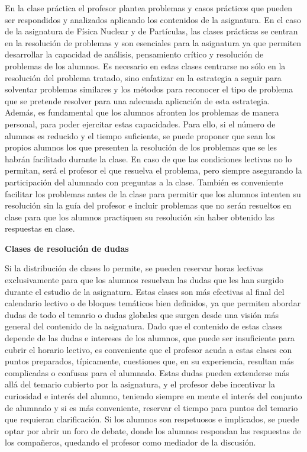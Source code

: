\documentclass[a4paper,12pt,twoside]{article}
\begin{document}
En la clase práctica el profesor plantea problemas y casos prácticos que pueden ser respondidos y analizados aplicando los contenidos de la asignatura. En el caso de la asignatura de Física Nuclear y de Partículas, las clases prácticas se centran en la resolución de problemas y son esenciales para la asignatura ya que permiten desarrollar la capacidad de análisis, pensamiento crítico y resolución de problemas de los alumnos. Es necesario en estas clases centrarse no sólo en la resolución del problema tratado, sino enfatizar en la estrategia a seguir para solventar problemas similares y los métodos para reconocer el tipo de problema que se pretende resolver para una adecuada aplicación de esta estrategia. Además, es fundamental que los alumnos afronten los problemas de manera personal, para poder ejercitar estas capacidades. Para ello, si el número de alumnos es reducido y el tiempo suficiente, se puede proponer que sean los propios alumnos los que presenten la resolución de los problemas que se les habrán facilitado durante la clase. En caso de que las condiciones lectivas no lo permitan, será el profesor el que resuelva el problema, pero siempre asegurando la participación del alumnado con preguntas a la clase. También es conveniente facilitar los problemas antes de la clase para permitir que los alumnos intenten su resolución sin la guía del profesor e incluir problemas que no serán resueltos en clase para que los alumnos practiquen su resolución sin haber obtenido las respuestas en clase. 

\textbf{Clases de resolución de dudas} 

Si la distribución de clases lo permite, se pueden reservar horas lectivas exclusivamente para que los alumnos resuelvan las dudas que les han surgido durante el estudio de la asignatura. Estas clases son más efectivas al final del calendario lectivo o de bloques temáticos bien definidos, ya que permiten abordar dudas de todo el temario o dudas globales que surgen desde una visión más general del contenido de la asignatura. Dado que el contenido de estas clases depende de las dudas e intereses de los alumnos, que puede ser insuficiente para cubrir el horario lectivo, es conveniente que el profesor acuda a estas clases con puntos preparados, típicamente, cuestiones que, en su experiencia, resultan más complicadas o confusas para el alumnado. Estas dudas pueden extenderse más allá del temario cubierto por la asignatura, y el profesor debe incentivar la curiosidad e interés del alumno, teniendo siempre en mente el interés del conjunto de alumnado y si es más conveniente, reservar el tiempo para puntos del temario que requieran clarificación. Si los alumnos son respetuosos e implicados, se puede optar por abrir un foro de debate, donde los alumnos respondan las respuestas de los compañeros, quedando el profesor como mediador de la discusión.
\end{document}
